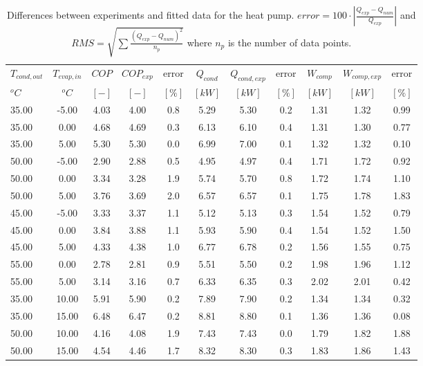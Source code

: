\documentclass[english]{SPFShortReport}
\begin{document}
\begin{table}[!ht]
\begin{small}
\caption{Differences between experiments and fitted data for the heat pump.          $error=100 \cdot |\frac{Q_{exp}-Q_{num}}{Q_{exp}}|$ and $RMS = \sqrt { \sum{\frac{(Q_{exp}-Q_{num})^2}{n_p}} }$ where $n_p$ is the number of data points.}
\begin{center}
\resizebox{12cm}{!} 
{
\begin{tabular}{l | c c c c c c c c c c } 
\hline
\hline
$T_{cond,out}$ &$T_{evap,in}$ &$COP$ &$COP_{exp}$ &error &$Q_{cond}$ &$Q_{cond,exp}$ &error &$W_{comp}$ &$W_{comp,exp}$ &error \\ 
$^oC$ &$^oC$ &$[-]$ &$[-]$ &$[\%]$ &$[kW]$ &$[kW]$ &$[\%]$ &$[kW]$ &$[kW]$ &$[\%]$\\ 
\hline
35.00  & -5.00 & 4.03 & 4.00 & 0.8 & 5.29 & 5.30 & 0.2 & 1.31 & 1.32 & 0.99\\ 
35.00  & 0.00 & 4.68 & 4.69 & 0.3 & 6.13 & 6.10 & 0.4 & 1.31 & 1.30 & 0.77\\ 
35.00  & 5.00 & 5.30 & 5.30 & 0.0 & 6.99 & 7.00 & 0.1 & 1.32 & 1.32 & 0.10\\ 
50.00  & -5.00 & 2.90 & 2.88 & 0.5 & 4.95 & 4.97 & 0.4 & 1.71 & 1.72 & 0.92\\ 
50.00  & 0.00 & 3.34 & 3.28 & 1.9 & 5.74 & 5.70 & 0.8 & 1.72 & 1.74 & 1.10\\ 
50.00  & 5.00 & 3.76 & 3.69 & 2.0 & 6.57 & 6.57 & 0.1 & 1.75 & 1.78 & 1.83\\ 
45.00  & -5.00 & 3.33 & 3.37 & 1.1 & 5.12 & 5.13 & 0.3 & 1.54 & 1.52 & 0.79\\ 
45.00  & 0.00 & 3.84 & 3.88 & 1.1 & 5.93 & 5.90 & 0.4 & 1.54 & 1.52 & 1.50\\ 
45.00  & 5.00 & 4.33 & 4.38 & 1.0 & 6.77 & 6.78 & 0.2 & 1.56 & 1.55 & 0.75\\ 
55.00  & 0.00 & 2.78 & 2.81 & 0.9 & 5.51 & 5.50 & 0.2 & 1.98 & 1.96 & 1.12\\ 
55.00  & 5.00 & 3.14 & 3.16 & 0.7 & 6.33 & 6.35 & 0.3 & 2.02 & 2.01 & 0.42\\ 
35.00  & 10.00 & 5.91 & 5.90 & 0.2 & 7.89 & 7.90 & 0.2 & 1.34 & 1.34 & 0.32\\ 
35.00  & 15.00 & 6.48 & 6.47 & 0.2 & 8.81 & 8.80 & 0.1 & 1.36 & 1.36 & 0.08\\ 
50.00  & 10.00 & 4.16 & 4.08 & 1.9 & 7.43 & 7.43 & 0.0 & 1.79 & 1.82 & 1.88\\ 
50.00  & 15.00 & 4.54 & 4.46 & 1.7 & 8.32 & 8.30 & 0.3 & 1.83 & 1.86 & 1.43\\ 

\end{tabular}}
\end{center}
\end{small}
\end{table}
\end{document}
